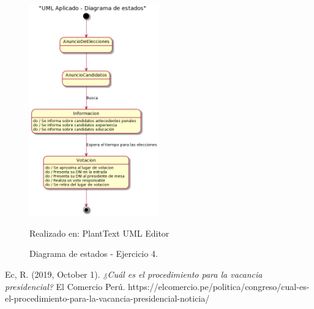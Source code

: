 \documentclass[a4paper,12pt]{article}
\begin{document}
    
\clearpage
\newpage

\begin{figure}[ht]
        \centering        
        \includegraphics[width=0.5\textwidth]{images/umlA03.PNG}
        \caption{Diagrama de estados - Ejercicio 4.}  
        {{\footnotesize Realizado en: PlantText UML Editor }}
\end{figure}


\begin{thebibliography}{00}

 Ec, R. (2019, October 1). \textit{¿Cuál es el procedimiento para la vacancia presidencial?} El Comercio Perú. https://elcomercio.pe/politica/congreso/cual-es-el-procedimiento-para-la-vacancia-presidencial-noticia/

\end{thebibliography}


\clearpage
\newpage



\clearpage
\newpage





    
\end{document}
